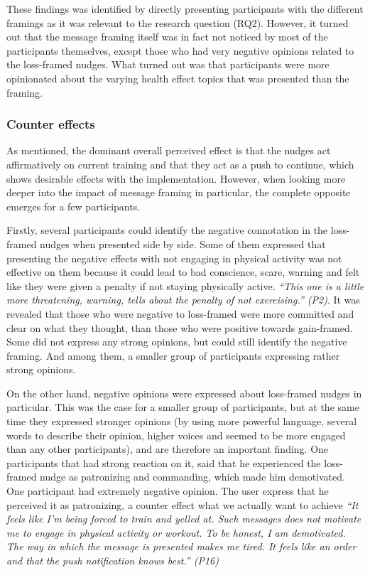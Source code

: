 These findings was identified by directly presenting participants with the different framings as it was relevant to the research question (RQ2). However, it turned out that the message framing itself was in fact not noticed by most of the participants themselves, except those who had very negative opinions related to the loss-framed nudges. What turned out was that participants were more opinionated about the varying health effect topics that was presented than the framing.

\subsubsection{Counter effects}
As mentioned, the dominant overall perceived effect is that the nudges act affirmatively on current training and that they act as a push to continue, which shows desirable effects with the implementation. However, when looking more deeper into the impact of message framing in particular, the complete opposite emerges for a few participants. 

Firstly, several participants could identify the negative connotation in the loss-framed nudges when presented side by side. Some of them expressed that presenting the negative effects with not engaging in physical activity was not effective on them because it could lead to bad conscience, scare, warning and felt like they were given a penalty if not staying physically active. \textit{“This one is a little more threatening, warning, tells about the penalty of not exercising.” (P2)}. It was revealed that those who were negative to loss-framed were more committed and clear on what they thought, than those who were positive towards gain-framed. Some did not express any strong opinions, but could still identify the negative framing. And among them, a smaller group of participants expressing rather strong opinions.

On the other hand, negative opinions were expressed about loss-framed nudges in particular. This was the case for a smaller group of participants, but at the same time they expressed stronger opinions (by using more powerful language, several words to describe their opinion, higher voices and seemed to be more engaged than any other participants), and are therefore an important finding. One participants that had strong reaction on it, said that he experienced the loss-framed nudge as patronizing and commanding, which made him demotivated. One participant had extremely negative opinion. The user express that he perceived it as patronizing, a counter effect what we actually want to achieve
\textit{“It feels like I'm being forced to train and yelled at. Such messages does not motivate me to engage in physical activity or workout. To be honest, I am demotivated. The way in which the message is presented makes me tired. It feels like an order and that the push notification knows best.” (P16)}

